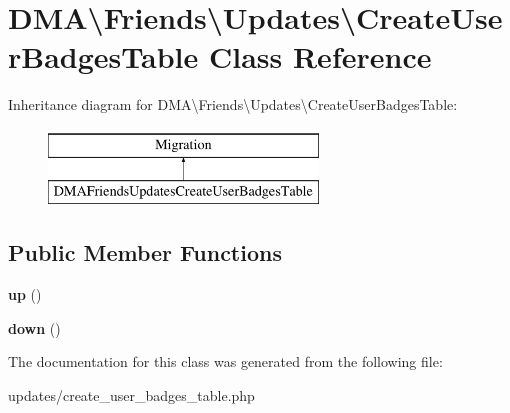 \hypertarget{classDMA_1_1Friends_1_1Updates_1_1CreateUserBadgesTable}{\section{D\-M\-A\textbackslash{}Friends\textbackslash{}Updates\textbackslash{}Create\-User\-Badges\-Table Class Reference}
\label{classDMA_1_1Friends_1_1Updates_1_1CreateUserBadgesTable}
}
Inheritance diagram for D\-M\-A\textbackslash{}Friends\textbackslash{}Updates\textbackslash{}Create\-User\-Badges\-Table\-:\begin{figure}[H]
\begin{center}
\leavevmode
\includegraphics[height=2.000000cm]{d9/df1/classDMA_1_1Friends_1_1Updates_1_1CreateUserBadgesTable}
\end{center}
\end{figure}
\subsection*{Public Member Functions}
\begin{DoxyCompactItemize}
\item 
\hypertarget{classDMA_1_1Friends_1_1Updates_1_1CreateUserBadgesTable_a4a68064533c4e71cf15c5ba09b32659f}{{\bfseries up} ()}\label{classDMA_1_1Friends_1_1Updates_1_1CreateUserBadgesTable_a4a68064533c4e71cf15c5ba09b32659f}

\item 
\hypertarget{classDMA_1_1Friends_1_1Updates_1_1CreateUserBadgesTable_addf4bdad492d1a8f0ea20ecc465eb405}{{\bfseries down} ()}\label{classDMA_1_1Friends_1_1Updates_1_1CreateUserBadgesTable_addf4bdad492d1a8f0ea20ecc465eb405}

\end{DoxyCompactItemize}


The documentation for this class was generated from the following file\-:\begin{DoxyCompactItemize}
\item 
updates/create\-\_\-user\-\_\-badges\-\_\-table.\-php\end{DoxyCompactItemize}
